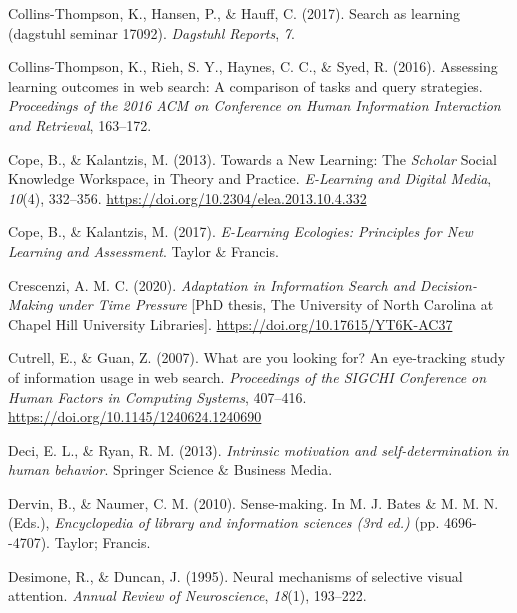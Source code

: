 \documentclass[letterpaper, nobind]{templates/ociamthesis}
\newlength{\cslhangindent}
\newenvironment{CSLReferences}[2] %
 {%
  \setlength{\parindent}{0pt}
  \ifodd #1
  \let\oldpar\par
  \def\par{\hangindent=\cslhangindent\oldpar}
  \fi
  \setlength{\parskip}{1mm}
  \setlength{\baselineskip}{6mm}
 }%
 {}
\begin{document}
\begin{CSLReferences}{1}{0}
\leavevmode{}%
Collins-Thompson, K., Hansen, P., \& Hauff, C. (2017). Search as learning (dagstuhl seminar 17092). \emph{Dagstuhl Reports}, \emph{7}.

\leavevmode{}%
Collins-Thompson, K., Rieh, S. Y., Haynes, C. C., \& Syed, R. (2016). Assessing learning outcomes in web search: A comparison of tasks and query strategies. \emph{Proceedings of the 2016 ACM on Conference on Human Information Interaction and Retrieval}, 163--172.

\leavevmode{}%
Cope, B., \& Kalantzis, M. (2013). Towards a {New Learning}: The {\emph{Scholar}} {Social Knowledge Workspace}, in {Theory} and {Practice}. \emph{E-Learning and Digital Media}, \emph{10}(4), 332--356. \url{https://doi.org/10.2304/elea.2013.10.4.332}

\leavevmode{}%
Cope, B., \& Kalantzis, M. (2017). \emph{E-{Learning Ecologies}: Principles for {New Learning} and {Assessment}}. {Taylor \& Francis}.

\leavevmode{}%
Crescenzi, A. M. C. (2020). \emph{Adaptation in {Information Search} and {Decision}-{Making} under {Time Pressure}} {[}PhD thesis, The University of North Carolina at Chapel Hill University Libraries{]}. \url{https://doi.org/10.17615/YT6K-AC37}

\leavevmode{}%
Cutrell, E., \& Guan, Z. (2007). What are you looking for? {An} eye-tracking study of information usage in web search. \emph{Proceedings of the {SIGCHI} Conference on Human Factors in Computing Systems}, 407--416. \url{https://doi.org/10.1145/1240624.1240690}

\leavevmode{}%
Deci, E. L., \& Ryan, R. M. (2013). \emph{Intrinsic motivation and self-determination in human behavior}. Springer Science \& Business Media.

\leavevmode{}%
Dervin, B., \& Naumer, C. M. (2010). Sense-making. In M. J. Bates \& M. M. N. (Eds.), \emph{Encyclopedia of library and information sciences (3rd ed.)} (pp. 4696-\/-4707). Taylor; Francis.

\leavevmode{}%
Desimone, R., \& Duncan, J. (1995). Neural mechanisms of selective visual attention. \emph{Annual Review of Neuroscience}, \emph{18}(1), 193--222.


\end{CSLReferences}
\end{document}
